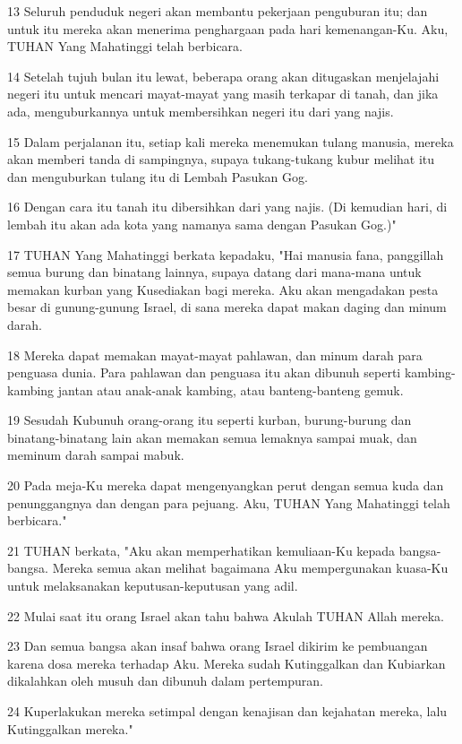 \par 13 Seluruh penduduk negeri akan membantu pekerjaan penguburan itu; dan untuk itu mereka akan menerima penghargaan pada hari kemenangan-Ku. Aku, TUHAN Yang Mahatinggi telah berbicara.
\par 14 Setelah tujuh bulan itu lewat, beberapa orang akan ditugaskan menjelajahi negeri itu untuk mencari mayat-mayat yang masih terkapar di tanah, dan jika ada, menguburkannya untuk membersihkan negeri itu dari yang najis.
\par 15 Dalam perjalanan itu, setiap kali mereka menemukan tulang manusia, mereka akan memberi tanda di sampingnya, supaya tukang-tukang kubur melihat itu dan menguburkan tulang itu di Lembah Pasukan Gog.
\par 16 Dengan cara itu tanah itu dibersihkan dari yang najis. (Di kemudian hari, di lembah itu akan ada kota yang namanya sama dengan Pasukan Gog.)"
\par 17 TUHAN Yang Mahatinggi berkata kepadaku, "Hai manusia fana, panggillah semua burung dan binatang lainnya, supaya datang dari mana-mana untuk memakan kurban yang Kusediakan bagi mereka. Aku akan mengadakan pesta besar di gunung-gunung Israel, di sana mereka dapat makan daging dan minum darah.
\par 18 Mereka dapat memakan mayat-mayat pahlawan, dan minum darah para penguasa dunia. Para pahlawan dan penguasa itu akan dibunuh seperti kambing-kambing jantan atau anak-anak kambing, atau banteng-banteng gemuk.
\par 19 Sesudah Kubunuh orang-orang itu seperti kurban, burung-burung dan binatang-binatang lain akan memakan semua lemaknya sampai muak, dan meminum darah sampai mabuk.
\par 20 Pada meja-Ku mereka dapat mengenyangkan perut dengan semua kuda dan penunggangnya dan dengan para pejuang. Aku, TUHAN Yang Mahatinggi telah berbicara."
\par 21 TUHAN berkata, "Aku akan memperhatikan kemuliaan-Ku kepada bangsa-bangsa. Mereka semua akan melihat bagaimana Aku mempergunakan kuasa-Ku untuk melaksanakan keputusan-keputusan yang adil.
\par 22 Mulai saat itu orang Israel akan tahu bahwa Akulah TUHAN Allah mereka.
\par 23 Dan semua bangsa akan insaf bahwa orang Israel dikirim ke pembuangan karena dosa mereka terhadap Aku. Mereka sudah Kutinggalkan dan Kubiarkan dikalahkan oleh musuh dan dibunuh dalam pertempuran.
\par 24 Kuperlakukan mereka setimpal dengan kenajisan dan kejahatan mereka, lalu Kutinggalkan mereka."
